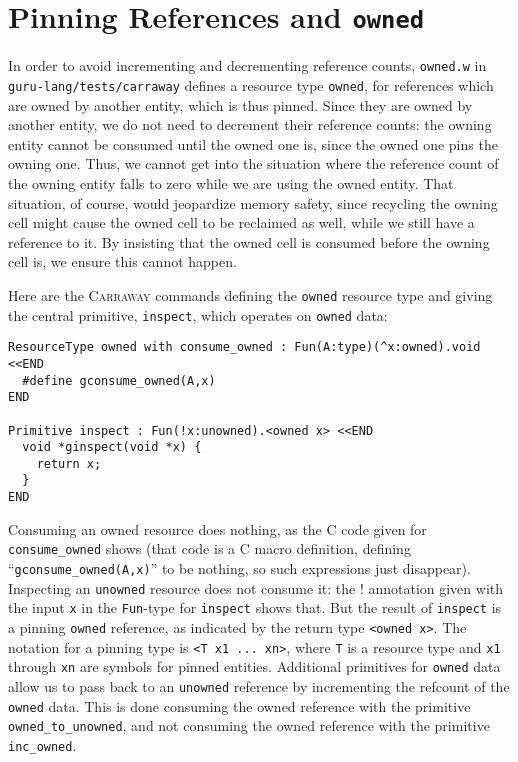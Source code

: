 \documentclass{book}[12pt]
\newcommand{\carraway}[0]{\textsc{Carraway}\xspace}
\begin{document}
\section{Pinning References and \texttt{owned}}
\label{ch9:pin}

In order to avoid incrementing and decrementing reference counts,
\texttt{owned.w} in \texttt{guru-lang/tests/carraway} defines a
resource type \texttt{owned}, for references which are owned by
another entity, which is thus pinned.  Since they are owned by another
entity, we do not need to decrement their reference counts: the owning
entity cannot be consumed until the owned one is, since the owned one
pins the owning one.  Thus, we cannot get into the situation where the
reference count of the owning entity falls to zero while we are using
the owned entity.  That situation, of course, would jeopardize memory
safety, since recycling the owning cell might cause the owned cell to
be reclaimed as well, while we still have a reference to it.  By
insisting that the owned cell is consumed before the owning cell is,
we ensure this cannot happen.

Here are the \carraway commands defining the \texttt{owned} resource
type and giving the central primitive, \texttt{inspect}, which
operates on \texttt{owned} data:

\begin{verbatim}
ResourceType owned with consume_owned : Fun(A:type)(^x:owned).void <<END
  #define gconsume_owned(A,x) 
END

Primitive inspect : Fun(!x:unowned).<owned x> <<END
  void *ginspect(void *x) {
    return x;
  }
END
\end{verbatim}

\noindent Consuming an owned resource does nothing, as the C code
given for \texttt{consume\_owned} shows (that code is a C macro
definition, defining ``\texttt{gconsume\_owned(A,x)}'' to be nothing,
so such expressions just disappear).  Inspecting an \texttt{unowned}
resource does not consume it: the ! annotation given with the input
\texttt{x} in the \texttt{Fun}-type for \texttt{inspect} shows that.
But the result of \texttt{inspect} is a pinning \texttt{owned}
reference, as indicated by the return type \texttt{<owned x>}.  The
notation for a pinning type is \texttt{<T x1 ... xn>}, where
\texttt{T} is a resource type and \texttt{x1} through \texttt{xn} are
symbols for pinned entities.  Additional primitives for \texttt{owned}
data allow us to pass back to an \texttt{unowned} reference by
incrementing the refcount of the \texttt{owned} data.  This is done
consuming the owned reference with the primitive
\texttt{owned\_to\_unowned}, and not consuming the owned reference
with the primitive \texttt{inc\_owned}.  
\end{document}
